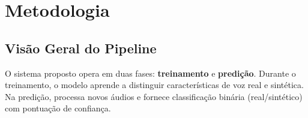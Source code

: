 \documentclass[12pt,a4paper]{article}
\begin{document}
\newpage




\section{Metodologia}
\label{sec:metodologia}

\subsection{Visão Geral do Pipeline}

O sistema proposto opera em duas fases: \textbf{treinamento} e
\textbf{predição}. Durante o treinamento, o modelo aprende a distinguir
características de voz real e sintética. Na predição, processa novos áudios e
fornece classificação binária (real/sintético) com pontuação de confiança.
\end{document}
